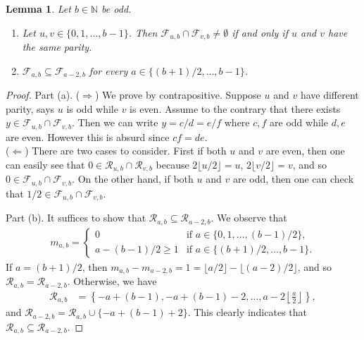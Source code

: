 \documentclass[12pt, reqno]{amsart}
\theoremstyle{plain}
\newtheorem{lemma}[theorem]{Lemma}
\theoremstyle{definition}
\begin{document}
\begin{lemma}\label{lemmaofF}
    Let $b\in\mathbb{N}$ be odd.
    \begin{enumerate}
        \item[(a)]\label{l3.4a} Let $u, v\in\{0, 1, \ldots, b-1\}$. Then $\mathcal{F}_{u, b}\cap\mathcal{F}_{v, b}\ne\emptyset$ if and only if $u$ and $v$ have the same parity.
        \item[(b)] $\mathcal{F}_{a, b}\subseteq \mathcal{F}_{a-2, b}$ for every $a\in\{(b+1)/2, \ldots, b-1\}$.
    \end{enumerate}
\end{lemma}
\begin{proof}
    Part (a). ($\Rightarrow$) We prove by contrapositive. Suppose $u$ and $v$ have different parity, says $u$ is odd while $v$ is even. Assume to the contrary that there exists $y\in\mathcal{F}_{u, b}\cap\mathcal{F}_{v, b}$. Then we can write $y=c/d=e/f$ where $c, f$ are odd while $d, e$ are even. However this is absurd since $cf=de$.\\
    ($\Leftarrow$) There are two cases to consider. First if both $u$ and $v$ are even, then one can easily see that $0\in\mathcal{R}_{u, b}\cap\mathcal{R}_{v, b}$ because $2\lfloor u/2\rfloor=u$, $2\lfloor v/2\rfloor=v$, and so $0\in\mathcal{F}_{u, b}\cap\mathcal{F}_{v, b}$.  On the other hand, if both $u$ and $v$ are odd, then one can check that $1/2\in\mathcal{F}_{u, b}\cap\mathcal{F}_{v, b}$.

    Part (b). It suffices to show that $\mathcal{R}_{a, b}\subseteq \mathcal{R}_{a-2, b}$. We observe that
    \begin{align*}
    m_{a, b}=\begin{cases}
        0 &\text{if } a\in\{0, 1, \ldots, (b-1)/2\},\\
        a-(b-1)/2\ge 1 &\text{if } a\in\{(b+1)/2, \ldots, b-1\}.
    \end{cases}
    \end{align*}
    If $a=(b+1)/2$, then $m_{a, b}-m_{a-2, b}=1=\lfloor a/2\rfloor-\lfloor (a-2)/2\rfloor$, and so $\mathcal{R}_{a, b}=\mathcal{R}_{a-2, b}$. Otherwise, we have
    \begin{align*}
        \mathcal{R}_{a, b}&=\left\{-a+(b-1), -a+(b-1)-2, \ldots, a-2\left\lfloor \frac{a}{2}\right\rfloor\right\},
    \end{align*}
    and $\mathcal{R}_{a-2, b}=\mathcal{R}_{a, b}\cup\{-a+(b-1)+2\}$.
    This clearly indicates that $\mathcal{R}_{a, b}\subseteq \mathcal{R}_{a-2, b}$.
\end{proof}
\end{document}
